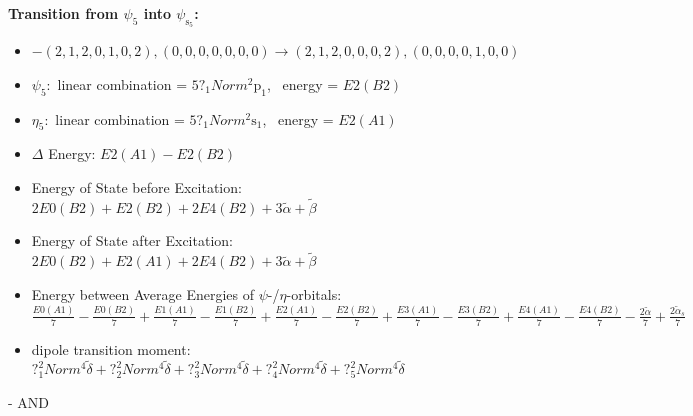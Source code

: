 \documentclass[12pt,a4paper]{article}
\begin{document}
        \noindent\textbf{Transition from $\psi_{5}$ into $\psi_{\text{s}_{5}}$:}
        \begin{itemize}
            \item $- (2, 1, 2, 0, 1, 0, 2), (0, 0, 0, 0, 0, 0, 0) \rightarrow (2, 1, 2, 0, 0, 0, 2), (0, 0, 0, 0, 1, 0, 0)$
        
            \item $\psi_{5}:$ linear combination = $5 ?_{1} Norm^{2} \text{p}_{1}$, \
            energy = $E2(B2)$
            
            \item $\eta_{5}:$ linear combination = $5 ?_{1} Norm^{2} \text{s}_{1}$, \
            energy = $E2(A1)$
            
                \item $\Delta$ Energy: $E2(A1) - E2(B2)$
                \item Energy of State before Excitation: $2 E0(B2) + E2(B2) + 2 E4(B2) + 3 \tilde{\alpha} + \tilde{\beta}$
                \item Energy of State after Excitation: $2 E0(B2) + E2(A1) + 2 E4(B2) + 3 \tilde{\alpha} + \tilde{\beta}$
                \item Energy between Average Energies of $\psi$-/$\eta$-orbitals: $\frac{E0(A1)}{7} - \frac{E0(B2)}{7} + \frac{E1(A1)}{7} - \frac{E1(B2)}{7} + \frac{E2(A1)}{7} - \frac{E2(B2)}{7} + \frac{E3(A1)}{7} - \frac{E3(B2)}{7} + \frac{E4(A1)}{7} - \frac{E4(B2)}{7} - \frac{2 \tilde{\alpha}}{7} + \frac{2 \tilde{\alpha}_{s}}{7}$
            
            \item dipole transition moment: $?_{1}^{2} Norm^{4} \tilde{\delta} + ?_{2}^{2} Norm^{4} \tilde{\delta} + ?_{3}^{2} Norm^{4} \tilde{\delta} + ?_{4}^{2} Norm^{4} \tilde{\delta} + ?_{5}^{2} Norm^{4} \tilde{\delta}$
        
        \end{itemize}
        
 -  AND 
\end{document}
